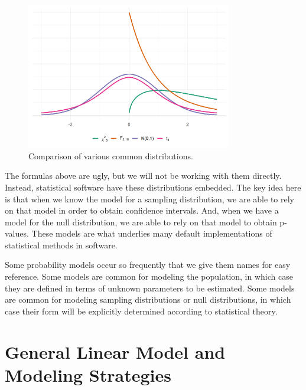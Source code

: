 \documentclass[
]{book}
\theoremstyle{plain}
\theoremstyle{mydefn}
\theoremstyle{myexmpl}
\theoremstyle{remark}
\begin{document}
\begin{figure}

{\centering \includegraphics[width=0.8\textwidth]{./Images/essential-probability-comparisons-1} 

}

\caption{Comparison of various common distributions.}\label{fig:essential-probability-comparisons}
\end{figure}

The formulas above are ugly, but we will not be working with them directly. Instead, statistical software have these distributions embedded. The key idea here is that when we know the model for a sampling distribution, we are able to rely on that model in order to obtain confidence intervals. And, when we have a model for the null distribution, we are able to rely on that model to obtain p-values. These models are what underlies many default implementations of statistical methods in software.

\begin{rmdkeyidea}
Some probability models occur so frequently that we give them names for easy reference. Some models are common for modeling the population, in which case they are defined in terms of unknown parameters to be estimated. Some models are common for modeling sampling distributions or null distributions, in which case their form will be explicitly determined according to statistical theory.
\end{rmdkeyidea}

\hypertarget{part-general-linear-model-and-modeling-strategies}{%
\part{General Linear Model and Modeling Strategies}\label{part-general-linear-model-and-modeling-strategies}}
\end{document}
